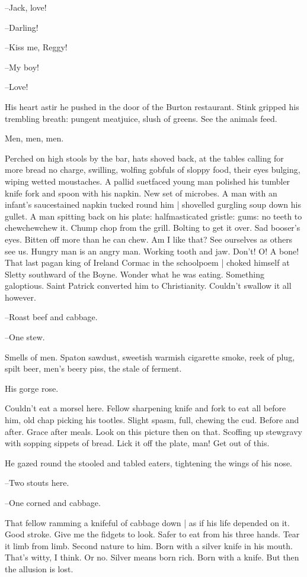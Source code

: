 --Jack,
love!

--Darling!

--Kiss me,
Reggy!

--My boy!

--Love!

His heart astir
he pushed in the door of the Burton restaurant.
Stink gripped his trembling breath:
pungent meatjuice, slush of greens.
See the animals feed.

Men, men, men.

Perched on high stools by the bar,
hats shoved back,
at the tables calling for more bread no charge,
swilling,
wolfing gobfuls of sloppy food,
their eyes bulging,
wiping wetted moustaches.
A pallid suetfaced young man polished his tumbler knife fork and spoon with his napkin.
New set of microbes.
A man with an infant's saucestained napkin tucked round him |
shovelled gurgling soup down his gullet.
A man spitting back on his plate:
halfmasticated gristle:
gums:
no teeth to chewchewchew it.
Chump chop from the grill.
Bolting to get it over.
Sad booser's eyes.
Bitten off more than he can chew.
Am I like that?
See ourselves as others see us.
Hungry man is an angry man.
Working tooth and jaw.
Don't!
O! A bone!
That last pagan king of Ireland Cormac in the schoolpoem |
choked himself at Sletty southward of the Boyne.
Wonder what he was eating.
Something galoptious.
Saint Patrick converted him to Christianity.
Couldn't swallow it all however.

--Roast beef and cabbage.

--One stew.

Smells of men.
Spaton sawdust,
sweetish warmish cigarette smoke,
reek of plug, spilt beer,
men's beery piss,
the stale of ferment.

His gorge rose.

Couldn't eat a morsel here.
Fellow sharpening knife and fork to eat all before him,
old chap picking his tootles.
Slight spasm, full, chewing the cud.
Before and after.
Grace after meals.
Look on this picture then on that.
Scoffing up stewgravy with sopping sippets of bread.
Lick it off the plate, man!
Get out of this.

He gazed round the stooled and tabled eaters,
tightening the wings of his nose.

--Two stouts here.

--One corned and cabbage.

That fellow ramming a knifeful of cabbage down |
as if his life depended on it.
Good stroke.
Give me the fidgets to look.
Safer to eat from his three hands.
Tear it limb from limb.
Second nature to him.
Born with a silver knife in his mouth.
That's witty, I think.
Or no.
Silver means born rich.
Born with a knife.
But then the allusion is lost.

